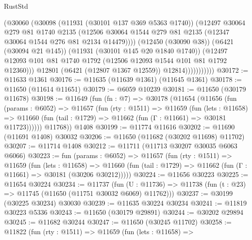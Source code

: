 \begin{lexlean}{RustStd}
\begin{coremodule}
                          (@30060
                            (@30098
                              (@11931 (@30101 @137 @369 @5363 @1740))
                              (@12497
                                @30064
                                @279
                                @81
                                @1740
                                @2135
                                (@12506
                                  @30064
                                  @1544
                                  @279
                                  @81
                                  @2135
                                  (@12347 @30064 @1544 @276 @81 @2134 @14479))))
                            (@12450 (@30090 @38))
                            (@6421 (@30094 @21 @145))
                            (@11931 (@30101 @145 @20 @1840 @1740))
                            (@12497
                              @12093
                              @101
                              @81
                              @1740
                              @1792
                              (@12506 @12093 @1544 @101 @81 @1792 @12360)))
                          @12801
                          (@6421 (@12807 @1367 @12559))
                          @12814)))))))))))
@30172 := @11633 @1361
@30176 := @11635 (@11639 @1361) (@11645 @1361)
@30178 := @11650 (@11614 @11651)
@30179 := @6059 @10239
@30181 := @11650 (@30179 @11678)
@30198 := @11649
    (fun (fn : @7) =>
    @30178
      (@11654
        (@11656
          (fun (params : @6052) =>
          @11657
            (fun (rty : @1511) =>
            @11659
              (fun (lets : @11658) =>
              @11660 (fun (tail : @1729) => @11662 (fun (Γ : @11661) => @30181 @11723))))))
        @11768))
    @1408
@30199 := @11774 @11616
@30202 := @11690 (@11691 @1408) @30032
@30206 := @11650 (@11682 (@30202 @11698) @11702)
@30207 := @11714 @1408
@30212 := @11711 (@11713 @30207 @30035 @6063 @6066)
@30223 := fun (params : @6052) =>
  @11657
    (fun (rty : @1511) =>
    @11659
      (fun (lets : @11658) =>
      @11660 (fun (tail : @1729) => @11662 (fun (Γ : @11661) => @30181 (@30206 @30212)))))
@30224 := @11656 @30223
@30225 := @11654 @30224
@30234 := @11737
    (fun (U : @11736) => @11738 (fun (t : @23) => @11745 (@11650 (@11751 @30032 @6069) @11762)))
@30237 := @30199 (@30225 @30234) @30030
@30239 := @11635 @30224 @30234
@30241 := @11819 @30223 @5336
@30243 := @11650 (@30179 @29891)
@30244 := @30202 @29894
@30245 := @11682 @30244
@30247 := @11650 (@30245 @11702)
@30258 := @11822
    (fun (rty : @1511) =>
    @11659
      (fun (lets : @11658) =>

\end{coremodule}
\end{lexlean}
